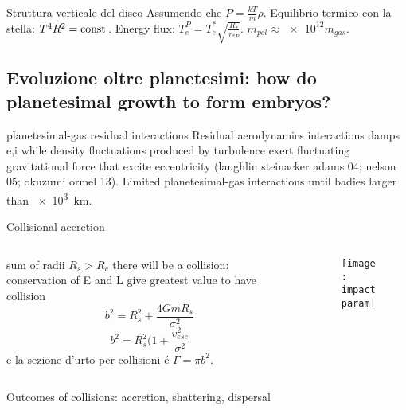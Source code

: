 \begin{wordonframe}{Struttura verticale del disco}
Assumendo che $P=\frac{kT}{m}\rho$.
Equilibrio termico con la stella: $T^4R^2=\operatorname{const}{}$. Energy flux: $T_e^P=T_e^*\sqrt{\frac{R_*}{r_{*P}}}$.
$m_{pol}\approx\num{e12}m_{gas}$.
\end{wordonframe}

\subsection{Evoluzione oltre planetesimi: how do planetesimal growth to form embryos?}

\begin{wordonframe}{planetesimal-gas residual interactions}
Residual aerodynamics interactions damps e,i while density fluctuations produced by turbulence exert fluctuating gravitational force that excite eccentricity (laughlin steinacker adams 04; nelson 05; okuzumi ormel 13). Limited planetesimal-gas interactions until badies larger than \SI{e3}{\kilo\meter}.
\end{wordonframe}

\begin{frame}{Collisional accretion}
\begin{columns}[T]\begin{column}{0.5\textwidth}
sum of radii $R_s>R_c$ there will be a collision: conservation of E and L give greatest value to have collision
\[b^2=R_s^2+\frac{4GmR_s}{\sigma^2}\]
\[b^2=R_s^2(1+\frac{v_{esc}^2}{\sigma^2}\]
e la sezione d'urto per collisioni \'e $\Gamma=\pi b^2$.
\end{column}\begin{column}{0.5\textwidth}
\begin{figure}[!ht]\texttt{[image: impactparam]}\label{fig:impactparam}\end{figure}
\end{column}\end{columns}
\end{frame}

\begin{frame}{Outcomes of collisions: accretion, shattering, dispersal}
\begin{columns}[T]\begin{column}{0.5\textwidth}

\end{column}\begin{column}{0.5\textwidth}

\end{column}\end{columns}
\end{frame}

